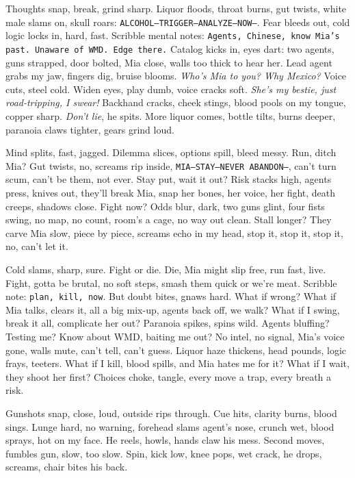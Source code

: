 \documentclass[12pt,oneside]{book}
\newcommand{\note}[1]{\texttt{#1}}
\begin{document}
Thoughts snap, break, grind sharp. Liquor floods, throat burns, gut twists, white male slams on, skull roars: \note{ALCOHOL—TRIGGER—ANALYZE—NOW—}. Fear bleeds out, cold logic locks in, hard, fast. Scribble mental notes: \note{Agents, Chinese, know Mia’s past. Unaware of WMD. Edge there.} Catalog kicks in, eyes dart: two agents, guns strapped, door bolted, Mia close, walls too thick to hear her. Lead agent grabs my jaw, fingers dig, bruise blooms. \textit{Who’s Mia to you? Why Mexico?} Voice cuts, steel cold. Widen eyes, play dumb, voice cracks soft. \textit{She’s my bestie, just road-tripping, I swear!} Backhand cracks, cheek stings, blood pools on my tongue, copper sharp. \textit{Don’t lie}, he spits. More liquor comes, bottle tilts, burns deeper, paranoia claws tighter, gears grind loud.

Mind splits, fast, jagged. Dilemma slices, options spill, bleed messy. Run, ditch Mia? Gut twists, no, screams rip inside, \note{MIA—STAY—NEVER ABANDON—}, can’t turn scum, can’t be them, not ever. Stay put, wait it out? Risk stacks high, agents press, knives out, they’ll break Mia, snap her bones, her voice, her fight, death creeps, shadows close. Fight now? Odds blur, dark, two guns glint, four fists swing, no map, no count, room’s a cage, no way out clean. Stall longer? They carve Mia slow, piece by piece, screams echo in my head, stop it, stop it, stop it, no, can’t let it.

Cold slams, sharp, sure. Fight or die. Die, Mia might slip free, run fast, live. Fight, gotta be brutal, no soft steps, smash them quick or we’re meat. Scribble note: \note{plan, kill, now}. But doubt bites, gnaws hard. What if wrong? What if Mia talks, clears it, all a big mix-up, agents back off, we walk? What if I swing, break it all, complicate her out? Paranoia spikes, spins wild. Agents bluffing? Testing me? Know about WMD, baiting me out? No intel, no signal, Mia’s voice gone, walls mute, can’t tell, can’t guess. Liquor haze thickens, head pounds, logic frays, teeters. What if I kill, blood spills, and Mia hates me for it? What if I wait, they shoot her first? Choices choke, tangle, every move a trap, every breath a risk.

Gunshots snap, close, loud, outside rips through. Cue hits, clarity burns, blood sings. Lunge hard, no warning, forehead slams agent’s nose, crunch wet, blood sprays, hot on my face. He reels, howls, hands claw his mess. Second moves, fumbles gun, slow, too slow. Spin, kick low, knee pops, wet crack, he drops, screams, chair bites his back. 
\end{document}

